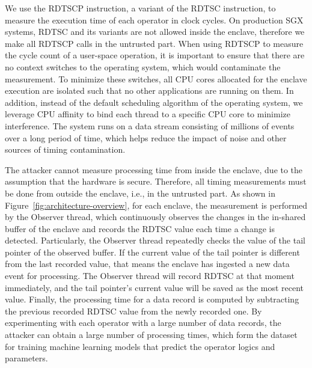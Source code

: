 We use the RDTSCP instruction, a variant of the RDTSC instruction, to measure the execution time of each operator in clock
cycles. On production SGX systems, RDTSC and its variants are not allowed inside the enclave, therefore we make all RDTSCP calls in the untrusted part. When using RDTSCP to measure the cycle count of a user-space operation, it 
is important to ensure that there are no context switches to the operating system, which would contaminate the
measurement. To minimize these switches, all CPU cores allocated for the enclave execution are isolated such that no
other applications are running on them.  In addition,
instead of the default scheduling algorithm of the operating system, we leverage CPU affinity to bind each thread to a
specific CPU core to minimize interference. The system runs on a data stream consisting of millions of events over a long
period of time, which helps reduce the impact of noise and other sources of timing contamination.


The attacker cannot measure processing time from inside the enclave, due to the assumption that the hardware is secure.
Therefore, all timing measurements must be done from outside the enclave, i.e., in the untrusted part. As shown in
Figure~\ref{fig:architecture-overview}, for each enclave, the measurement is performed by the Observer
thread, which continuously observes the changes in the in-shared buffer of the enclave and records the RDTSC value each
time a change is detected. Particularly, the Observer thread repeatedly checks the value of the tail pointer of the
observed buffer. If the current value of the tail pointer is different from the last recorded value, that means the
enclave has ingested a new data event for processing.  The Observer thread will record RDTSC at that moment immediately,
and the tail pointer's current value will be saved as the most recent value. Finally, the processing time for a data
record is computed by subtracting the previous recorded RDTSC value from the newly recorded one. By experimenting with
each operator with a large number of data records, the attacker can obtain a large number of processing times, which form the
dataset for training machine learning models that predict the operator logics and parameters.

